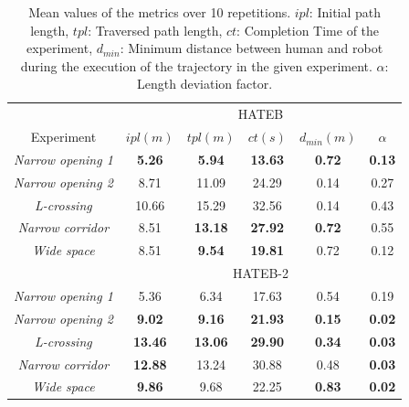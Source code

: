 \begin{table}[ht!]
    \centering
    \begin{tabular}{|c|c|c|c|c|c|}
    \hline
     & \multicolumn{5}{c|}{HATEB} \\
    \cline{2-6}
    Experiment & $ipl (m)$ & $tpl (m)$ & $ct (s)$ & $d_{min} (m)$ & $\alpha$ \\
    \hline
    \textit{Narrow opening 1} & \bf{5.26} & \bf{5.94} & \bf{13.63} & \bf{0.72} & \bf{0.13} \\ 
    \hline
    \textit{Narrow opening 2} & 8.71 & 11.09 & 24.29 & 0.14 & 0.27 \\
    \hline
    \textit{L-crossing} & 10.66 & 15.29 & 32.56 & 0.14 & 0.43 \\
    \hline
    \textit{Narrow corridor} & 8.51 & \bf{13.18} & \bf{27.92} & \bf{0.72} & 0.55 \\
    \hline
    \textit{Wide space} & 8.51 & \bf{9.54} & \bf{19.81} & 0.72 & 0.12 \\
    \hline
    & \multicolumn{5}{c|}{HATEB-2}\\
     \cline{2-6}
    \hline
    \textit{Narrow opening 1} & 5.36 & 6.34 & 17.63 & 0.54 & 0.19\\
    \hline
    \textit{Narrow opening 2} & \bf{9.02} & \bf{9.16} & \bf{21.93} & \bf{0.15} &\bf{0.02}\\
    \hline
    \textit{L-crossing} & \bf{13.46} & \bf{13.06} & \bf{29.90} & \bf{0.34} &\bf{0.03}\\
    \hline
    \textit{Narrow corridor} & \bf{12.88} & 13.24 & 30.88 & 0.48 &\bf{0.03}\\
    \hline
    \textit{Wide space} & \bf{9.86} & 9.68 & 22.25 & \bf{0.83} &\bf{0.02}\\
     \hline
    \end{tabular}
    \caption{Mean values of the metrics over 10 repetitions. $ipl$: Initial path length, $tpl$: Traversed path length, $ct$: Completion Time of the experiment, $d_{min}$: Minimum distance between human and robot during the execution of the trajectory in the given experiment. $\alpha$: Length deviation factor.}
    \label{results}
\end{table}

